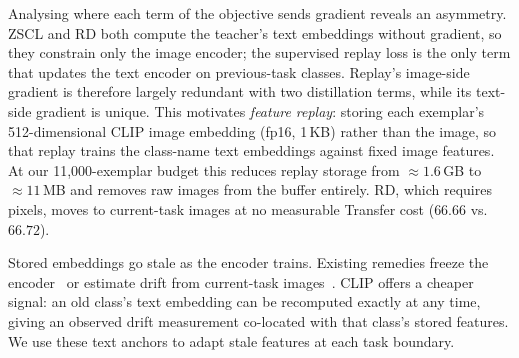 

Analysing where each term of the objective sends gradient reveals an asymmetry. ZSCL and RD both compute the teacher's text embeddings without gradient, so they constrain only the image encoder; the supervised replay loss is the only term that updates the text encoder on previous-task classes. Replay's image-side gradient is therefore largely redundant with two distillation terms, while its text-side gradient is unique. This motivates \emph{feature replay}: storing each exemplar's 512-dimensional CLIP image embedding (fp16, 1\,KB) rather than the image, so that replay trains the class-name text embeddings against fixed image features. At our 11{,}000-exemplar budget this reduces replay storage from ${\approx}1.6$\,GB to ${\approx}11$\,MB and removes raw images from the buffer entirely. RD, which requires pixels, moves to current-task images at no measurable Transfer cost ($66.66$ vs.\ $66.72$).

Stored embeddings go stale as the encoder trains. Existing remedies freeze the encoder~\cite{pellegrini2020latent, hayes2020remind} or estimate drift from current-task images~\cite{yu2020sdc, iscen2020memory}. CLIP offers a cheaper signal: an old class's text embedding can be recomputed exactly at any time, giving an observed drift measurement co-located with that class's stored features. We use these text anchors to adapt stale features at each task boundary.


